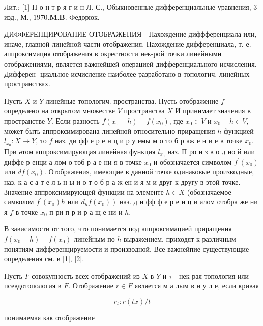 \documentclass[10pt]{article}
\begin{document}
Лит.: [1] П о н т р я г и н Л. С., Обыкновенные дифференциальные уравнения, 3 изд., М., $1970 . \boldsymbol{M} . \boldsymbol{B}$. Федорюк.



ДИФФЕРЕНЦИРОВАНИЕ ОТОБРАЖЕНИЯ - Нахождение диффференциала или, иначе, главной линейной части отображения. Нахождение дифференциала, т. е. аппроксимация отображения в окрестности нек-рой точки линейными отображениями, является важнейшей операцией дифференциального исчисления. Дифферен- циальное исчисление наиболее разработано в топологич. линейных пространствах.



Пусть $X$ и $Y$-линейные топологич. пространства. Пусть отображение $f$ определено на открытом множестве $V$ пространства $X$ И принимает значения в пространстве $Y$. Если разность $f\left(x_{0}+h\right)-f\left(x_{0}\right)$, где $x_{0} \in V$ и $x_{0}+h \in V$, может быть аппроксимирована линейной относительно приращения $h$ функцией $l_{x_{0}}: X \rightarrow Y$, то $f$ наз. ди фф е р е н ц и р у емы м о то б р аж е н и е в точке $x_{0}$. При әтом аппроксимирующая линейная функция $l_{x_{0}}$ наз. П ро и з в о д но й или диффе р енци а лом о тоб р а е ни я в точке $x_{0}$ и обозначается символом $f^{\prime}\left(x_{0}\right)$ или $d f\left(x_{0}\right)$. Отображения, имеющие в данной точке одинаковые производные, наз. к а с а т е л ь н ы и о т о б р а ж ен и я м и друг к другу в этой точке. Значение аппроксимирующей функции на элементе $h \in X$ (обозначаемое символом $f^{\prime}\left(x_{0}\right) h$ или $\left.d_{h} f\left(x_{0}\right)\right)$ наз. д и фф ф е р е н ц и алом отобра же ни я $f$ в точке $x_{0}$ п ри п р и р а щ е ни и $h$.



В зависимости от того, что понимается под аппроксимацией приращения $f\left(x_{0}+h\right)-f\left(x_{0}\right)$ линейным по $h$ выражением, приходят к различным понятиям дифференцируемости и производной. Все важнейпие существующие определения см. в [1], [2].



Пусть $F$-совокупность всех отображений из $X$ в $Y$ и $\tau$ - нек-рая топология или псевдотопология в $F$. Отображение $r \in F$ является м а лым в н у л е, если кривая



\[

r_{t}: r(t x) / t

\]



понимаемая как отображение
\end{document}
